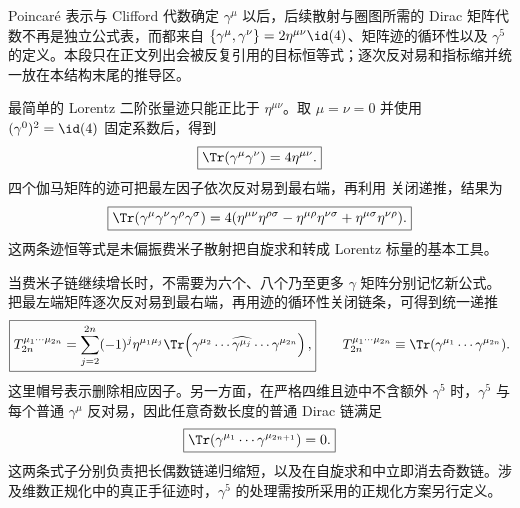 
Poincar\'e 表示与 Clifford 代数确定 $\gamma^\mu$ 以后，后续散射与圈图所需的 Dirac 矩阵代数不再是独立公式表，而都来自
$\{\gamma^\mu,\gamma^\nu\}=2\eta^{\mu\nu}\id(4)$、矩阵迹的循环性以及 $\gamma^5$ 的定义。本段只在正文列出会被反复引用的目标恒等式；逐次反对易和指标缩并统一放在本结构末尾的推导区。

最简单的 Lorentz 二阶张量迹只能正比于 $\eta^{\mu\nu}$。取 $\mu=\nu=0$ 并使用 $(\gamma^0)^2=\id(4)$ 固定系数后，得到
\begin{equation}
 \boxed{\Tr(\gamma^\mu\gamma^\nu)=4\eta^{\mu\nu}.}
 \label{eq:trace-two-gamma-r9}
\end{equation}
四个伽马矩阵的迹可把最左因子依次反对易到最右端，再利用 关闭递推，结果为
\begin{equation}
 \boxed{
 \Tr(\gamma^\mu\gamma^\nu\gamma^\rho\gamma^\sigma)
 =4(\eta^{\mu\nu}\eta^{\rho\sigma}
 -\eta^{\mu\rho}\eta^{\nu\sigma}
 +\eta^{\mu\sigma}\eta^{\nu\rho}).}
 \label{eq:trace-four-gamma-r9}
\end{equation}
这两条迹恒等式是未偏振费米子散射把自旋求和转成 Lorentz 标量的基本工具。


当费米子链继续增长时，不需要为六个、八个乃至更多 $\gamma$ 矩阵分别记忆新公式。把最左端矩阵逐次反对易到最右端，再用迹的循环性关闭链条，可得到统一递推
\begin{equation}
 \boxed{
 T_{2n}^{\mu_1\cdots\mu_{2n}}
 =\sum_{j=2}^{2n}(-1)^j\eta^{\mu_1\mu_j}
 \Tr\!\left(\gamma^{\mu_2}\cdots\widehat{\gamma^{\mu_j}}\cdots\gamma^{\mu_{2n}}\right),}
 \qquad
 T_{2n}^{\mu_1\cdots\mu_{2n}}
 \equiv\Tr(\gamma^{\mu_1}\cdots\gamma^{\mu_{2n}}).
 \label{eq:trace-even-recursion-r68}
\end{equation}
这里帽号表示删除相应因子。另一方面，在严格四维且迹中不含额外 $\gamma^5$ 时，$\gamma^5$ 与每个普通 $\gamma^\mu$ 反对易，因此任意奇数长度的普通 Dirac 链满足
\begin{equation}
 \boxed{\Tr(\gamma^{\mu_1}\cdots\gamma^{\mu_{2n+1}})=0.}
 \label{eq:trace-odd-zero-r68}
\end{equation}
这两条式子分别负责把长偶数链递归缩短，以及在自旋求和中立即消去奇数链。涉及维数正规化中的真正手征迹时，$\gamma^5$ 的处理需按所采用的正规化方案另行定义。

